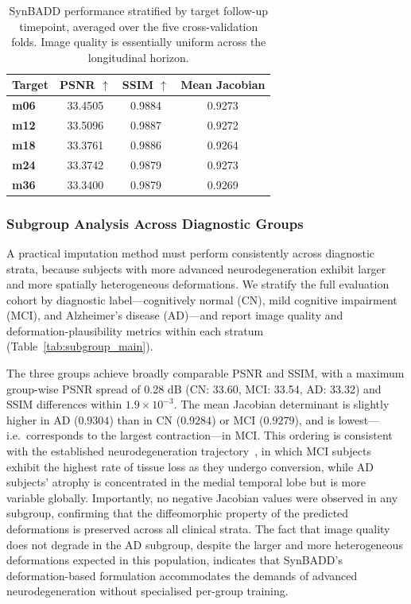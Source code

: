 \begin{table}[ht]
\centering
\caption{SynBADD performance stratified by target follow-up timepoint, averaged over the five cross-validation folds. Image quality is essentially uniform across the longitudinal horizon.}
\begin{tabular}{>{\bfseries}lccc}
\toprule
Target & PSNR $\uparrow$ & SSIM $\uparrow$ & Mean Jacobian \\
\midrule
m06 & 33.4505 & 0.9884 & 0.9273 \\
m12 & 33.5096 & 0.9887 & 0.9272 \\
m18 & 33.3761 & 0.9886 & 0.9264 \\
m24 & 33.3742 & 0.9879 & 0.9273 \\
m36 & 33.3400 & 0.9879 & 0.9269 \\
\bottomrule
\end{tabular}
\label{tab:per_timepoint}
\end{table}

\subsubsection{Subgroup Analysis Across Diagnostic Groups}

A practical imputation method must perform consistently across diagnostic strata, because subjects with more advanced neurodegeneration exhibit larger and more spatially heterogeneous deformations. We stratify the full evaluation cohort by diagnostic label---cognitively normal (CN), mild cognitive impairment (MCI), and Alzheimer's disease (AD)---and report image quality and deformation-plausibility metrics within each stratum (Table~\ref{tab:subgroup_main}).

The three groups achieve broadly comparable PSNR and SSIM, with a maximum group-wise PSNR spread of 0.28 dB (CN: 33.60, MCI: 33.54, AD: 33.32) and SSIM differences within $1.9 \times 10^{-3}$. The mean Jacobian determinant is slightly higher in AD ($0.9304$) than in CN ($0.9284$) or MCI ($0.9279$), and is lowest---i.e.\ corresponds to the largest contraction---in MCI. This ordering is consistent with the established neurodegeneration trajectory~\cite{braak1991neuropathological,jack2018nia}, in which MCI subjects exhibit the highest rate of tissue loss as they undergo conversion, while AD subjects' atrophy is concentrated in the medial temporal lobe but is more variable globally. Importantly, no negative Jacobian values were observed in any subgroup, confirming that the diffeomorphic property of the predicted deformations is preserved across all clinical strata. The fact that image quality does not degrade in the AD subgroup, despite the larger and more heterogeneous deformations expected in this population, indicates that SynBADD's deformation-based formulation accommodates the demands of advanced neurodegeneration without specialised per-group training.

